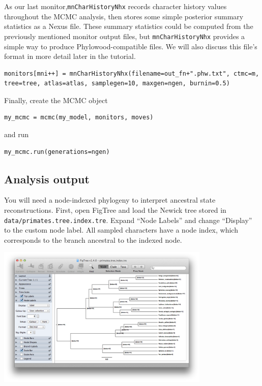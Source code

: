 As our last monitor,{\tt mnCharHistoryNhx} records character history values throughout the MCMC analysis, then stores some simple posterior summary statistics as a Nexus file.
These summary statistics could be computed from the previously mentioned monitor output files, but {\tt mnCharHistoryNhx} provides a simple way to produce Phylowood-compatible files.
We will also discuss this file's format in more detail later in the tutorial.

\begin{snugshade}
\begin{lstlisting}
monitors[mni++] = mnCharHistoryNhx(filename=out_fn+".phw.txt", ctmc=m, tree=tree, atlas=atlas, samplegen=10, maxgen=ngen, burnin=0.5)
\end{lstlisting}
\end{snugshade}

Finally, create the MCMC object

\begin{snugshade}
\begin{lstlisting}
my_mcmc = mcmc(my_model, monitors, moves)
\end{lstlisting}
\end{snugshade}

and run

\begin{snugshade}
\begin{lstlisting}
my_mcmc.run(generations=ngen)
\end{lstlisting}
\end{snugshade}

\subsection{Analysis output}

You will need a node-indexed phylogeny to interpret ancestral state reconstructions. First, open FigTree and load the Newick tree stored in {\tt data/primates.tree.index.tre}. Expand ``Node Labels'' and change ``Display'' to the custom node label. All sampled characters have a node index, which corresponds to the branch ancestral to the indexed node.

\includegraphics[width=4in]{figures/figtree_node_label}

